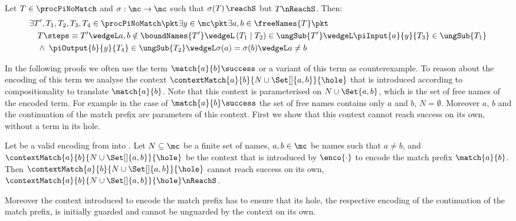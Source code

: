\documentclass[final,copyright,creativecommons]{eptcs}
\begin{document}
\begin{lemma}
	\label{prop:newCom}
	Let $ T \in \procPiNoMatch $ and $ \sigma : \mc \to \mc $ such that $ \sigma\!\left( T \right) \reachS $ but $ T \nReachS $.
	Then:
	\vspace{-0.5em}
	\begin{align*}
		& \exists T', T_1, T_2, T_3, T_4 \in \procPiNoMatch \pkt \exists y \in \mc \pkt \exists a, b \in \freeNames{T} \pkt\\
		& \hspace{1em} T \steps\equiv T' \wedgeL a, b \notin \boundNames{T'} \wedgeL \left( T_1 \mid T_2 \right) \in \ungSub{T'} \wedgeL \piInput{a}{y}{T_3} \in \ungSub{T_1}\\
		& \hspace{1em} \wedge \; \piOutput{b}{y}{T_4} \in \ungSub{T_2} \wedgeL \sigma(a) = \sigma(b) \wedgeL a \neq b
	\end{align*}
\end{lemma}

In the following proofs we often use the term $ \match{a}{b}\success $ or a variant of this term as counterexample. To reason about the encoding of this term we analyse the context $ \contextMatch{a}{b}{N \cup \Set[]{ a, b }}{\hole} $ that is introduced according to compositionality to translate $ \match{a}{b} $. Note that this context is parameterised on $ N \cup \Set{ a, b } $, which is the set of free names of the encoded term. For example in the case of $ \match{a}{b}\success $ the set of free names contains only $ a $ and $ b $, \ie $ N = \emptyset $. Moreover $ a $, $ b $ and the continuation of the match prefix are parameters of this context. First we show that this context cannot reach success on its own, \ie without a term in its hole.

\begin{lemma}
	\label{lem:contextCannotReachSuccess}
	Let \encod be a valid encoding from \piT into \piNM.
	Let $ N \subseteq \mc $ be a finite set of names,
	$ a, b \in \mc $ be names such that $ a \neq b $,
	and $ \contextMatch{a}{b}{N \cup \Set[]{ a, b }}{\hole} $ be the context that is introduced by $ \enco{\cdot} $ to encode the match prefix $ \match{a}{b} $. Then $ \contextMatch{a}{b}{N \cup \Set[]{ a, b }}{\hole} $ cannot reach success on its own, \ie $ \contextMatch{a}{b}{N \cup \Set[]{ a, b }}{\hole} \nReachS $.
\end{lemma}

Moreover the context introduced to encode the match prefix has to ensure that its hole, \ie the respective encoding of the continuation of the match prefix, is initially guarded and cannot be unguarded by the context on its own.
\end{document}
